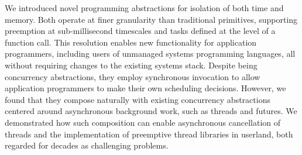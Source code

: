 We introduced novel programming abstractions for isolation of both time and memory.
Both operate at finer granularity than traditional primitives, supporting preemption
at sub-millisecond timescales and tasks defined at the level of a function call.
This resolution enables new functionality for application programmers, including
users of unmanaged systems programming languages, all without requiring changes to
the existing systems stack.  Despite being concurrency abstractions, they employ
synchronous invocation to allow application programmers to make their own scheduling
decisions.  However, we found that they compose naturally with existing concurrency
abstractions centered around asynchronous background work, such as threads and
futures.  We demonstrated how such composition can enable asynchronous cancellation
of
threads and the implementation of preemptive thread libraries in userland, both
regarded for decades as challenging problems.
